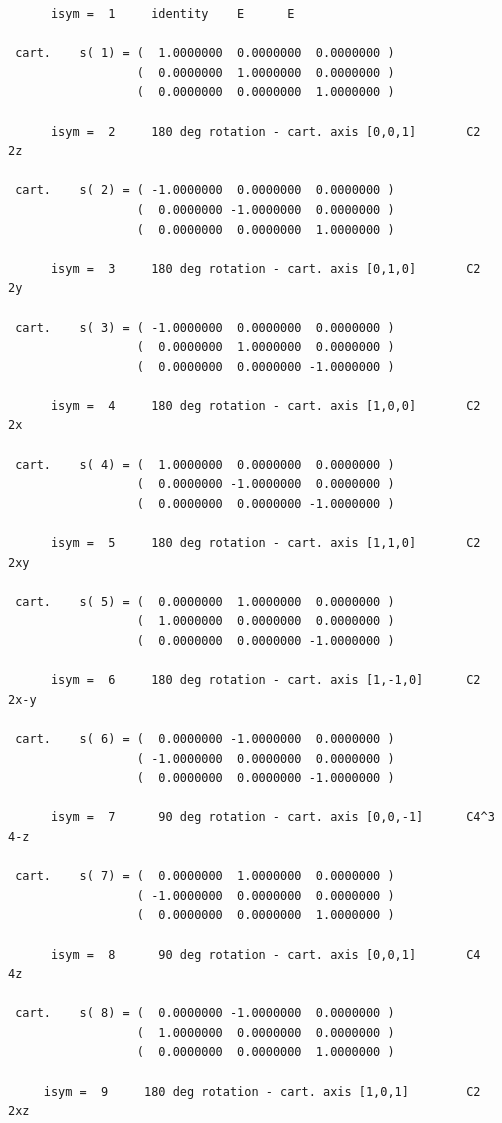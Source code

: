 \documentclass[12pt,a4paper]{article}
\begin{document}
\begin{verbatim}
      isym =  1     identity    E      E

 cart.    s( 1) = (  1.0000000  0.0000000  0.0000000 )
                  (  0.0000000  1.0000000  0.0000000 )
                  (  0.0000000  0.0000000  1.0000000 )

      isym =  2     180 deg rotation - cart. axis [0,0,1]       C2    2z

 cart.    s( 2) = ( -1.0000000  0.0000000  0.0000000 )
                  (  0.0000000 -1.0000000  0.0000000 )
                  (  0.0000000  0.0000000  1.0000000 )

      isym =  3     180 deg rotation - cart. axis [0,1,0]       C2    2y

 cart.    s( 3) = ( -1.0000000  0.0000000  0.0000000 )
                  (  0.0000000  1.0000000  0.0000000 )
                  (  0.0000000  0.0000000 -1.0000000 )

      isym =  4     180 deg rotation - cart. axis [1,0,0]       C2    2x

 cart.    s( 4) = (  1.0000000  0.0000000  0.0000000 )
                  (  0.0000000 -1.0000000  0.0000000 )
                  (  0.0000000  0.0000000 -1.0000000 )

      isym =  5     180 deg rotation - cart. axis [1,1,0]       C2    2xy

 cart.    s( 5) = (  0.0000000  1.0000000  0.0000000 )
                  (  1.0000000  0.0000000  0.0000000 )
                  (  0.0000000  0.0000000 -1.0000000 )

      isym =  6     180 deg rotation - cart. axis [1,-1,0]      C2    2x-y

 cart.    s( 6) = (  0.0000000 -1.0000000  0.0000000 )
                  ( -1.0000000  0.0000000  0.0000000 )
                  (  0.0000000  0.0000000 -1.0000000 )

      isym =  7      90 deg rotation - cart. axis [0,0,-1]      C4^3  4-z

 cart.    s( 7) = (  0.0000000  1.0000000  0.0000000 )
                  ( -1.0000000  0.0000000  0.0000000 )
                  (  0.0000000  0.0000000  1.0000000 )

      isym =  8      90 deg rotation - cart. axis [0,0,1]       C4    4z

 cart.    s( 8) = (  0.0000000 -1.0000000  0.0000000 )
                  (  1.0000000  0.0000000  0.0000000 )
                  (  0.0000000  0.0000000  1.0000000 )

     isym =  9     180 deg rotation - cart. axis [1,0,1]        C2    2xz


\end{verbatim}
\end{document}

